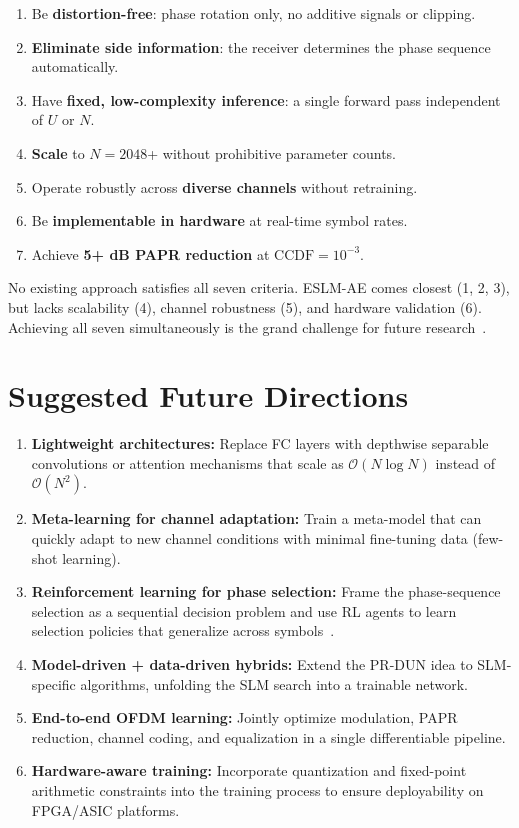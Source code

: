 \begin{enumerate}
    \item Be \textbf{distortion-free}: phase rotation only, no additive
          signals or clipping.
    \item \textbf{Eliminate side information}: the receiver determines the
          phase sequence automatically.
    \item Have \textbf{fixed, low-complexity inference}: a single forward
          pass independent of $U$ or $N$.
    \item \textbf{Scale} to $N = 2048$+ without prohibitive parameter counts.
    \item Operate robustly across \textbf{diverse channels} without retraining.
    \item Be \textbf{implementable in hardware} at real-time symbol rates.
    \item Achieve \textbf{5+ dB PAPR reduction} at $\mathrm{CCDF} = 10^{-3}$.
\end{enumerate}

No existing approach satisfies all seven criteria. ESLM-AE comes closest (1, 2, 3), but lacks scalability (4), channel robustness (5), and hardware validation (6). Achieving all seven simultaneously is the grand challenge for future research~\cite{da2024survey}.

\section{Suggested Future Directions}
\label{sec:future_directions}

\begin{enumerate}
    \item \textbf{Lightweight architectures:}
          Replace FC layers with depthwise separable convolutions or
          attention mechanisms that scale as $\mathcal{O}(N\log N)$
          instead of $\mathcal{O}(N^2)$.
    \item \textbf{Meta-learning for channel adaptation:}
          Train a meta-model that can quickly adapt to new channel
          conditions with minimal fine-tuning data (few-shot learning).
    \item \textbf{Reinforcement learning for phase selection:}
          Frame the phase-sequence selection as a sequential decision
          problem and use RL agents to learn selection policies
          that generalize across symbols~\cite{da2024survey}.
    \item \textbf{Model-driven + data-driven hybrids:}
          Extend the PR-DUN idea to SLM-specific algorithms,
          unfolding the SLM search into a trainable network.
    \item \textbf{End-to-end OFDM learning:}
          Jointly optimize modulation, PAPR reduction, channel coding,
          and equalization in a single differentiable pipeline.
    \item \textbf{Hardware-aware training:}
          Incorporate quantization and fixed-point arithmetic constraints
          into the training process to ensure deployability on
          FPGA/ASIC platforms.
\end{enumerate}


